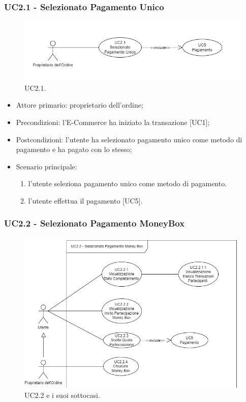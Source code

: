     \subsubsection{UC2.1 - Selezionato Pagamento Unico}

    \begin{figure}[H]
    \centering
    \includegraphics[scale=0.7]{immagini/UseCases-UC2-2.png}
    \caption{UC2.1.}
    \end{figure}

    \begin{itemize}
    \item Attore primario: proprietario dell'ordine;
    \item Precondizioni: l'E-Commerce ha iniziato la transazione [UC1];
    \item Postcondizioni: l'utente ha selezionato pagamento unico come metodo di pagamento e ha pagato con lo stesso;
    \item Scenario principale:
    \begin{enumerate}
        \item l'utente seleziona pagamento unico come metodo di pagamento.
        \item l'utente effettua il pagamento [UC5].
    \end{enumerate}
    \end{itemize}

    \subsubsection{UC2.2 -  Selezionato Pagamento MoneyBox}

    \begin{figure}[H]
    \centering
    \includegraphics[scale=0.7]{immagini/UseCases-UC2-3.png}
    \caption{UC2.2 e i suoi sottocasi.}
    \end{figure}


